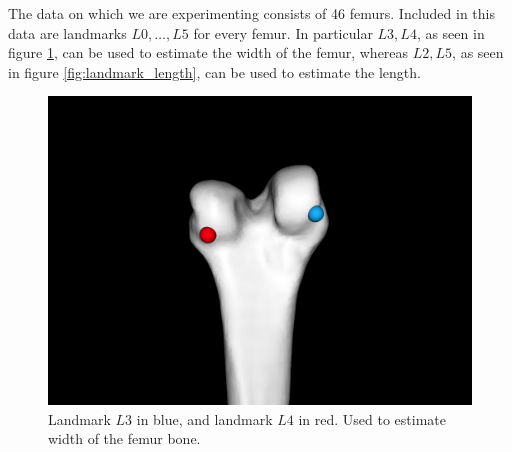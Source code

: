 \documentclass[10pt]{article}
\begin{document}

The data on which we are experimenting consists of 46 femurs. Included in this data are landmarks $L0,\dots,L5$ for every femur.
In particular $L3,L4$, as seen in figure \ref{fig:landmark_width}, can be used to estimate the width of the femur, whereas $L2,L5$, as seen in figure \ref{fig:landmark_length}, can be used to estimate the length.

\begin{figure}[h]
\centering
\includegraphics[scale=0.2]{screenshots/L3blue_L4red_width.png}
\caption{Landmark $L3$ in blue, and landmark $L4$ in red. Used to estimate width of the femur bone.}
\label{fig:landmark_width}
\end{figure}
\end{document}
